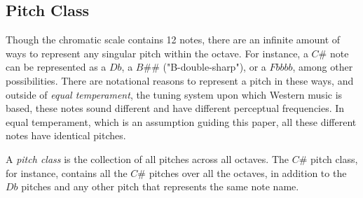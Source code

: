 \subsection{Pitch Class}

Though the chromatic scale contains 12 notes, there are an infinite amount of ways to represent any singular pitch within the octave. For instance, a $C\#$ note can be represented as a $Db$, a $B\#\#$ ("B-double-sharp"), or a $Fbbbb$, among other possibilities. There are notational reasons to represent a pitch in these ways, and outside of \textit{equal temperament}, the tuning system upon which Western music is based, these notes sound different and have different perceptual frequencies. In equal temperament, which is an assumption guiding this paper, all these different notes have identical pitches.

A \textit{pitch class} is the collection of all pitches across all octaves. The $C\#$ pitch class, for instance, contains all the $C\#$ pitches over all the octaves, in addition to the $Db$ pitches and any other pitch that represents the same note name.